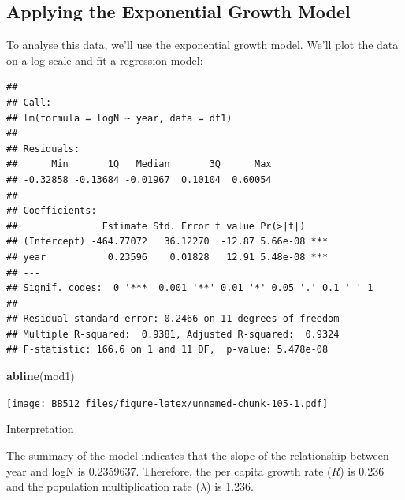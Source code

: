 \documentclass[
  a4paper]{book}
\newenvironment{Shaded}{\begin{snugshade}}{\end{snugshade}}
\newcommand{\AttributeTok}[1]{\textcolor[rgb]{0.13,0.29,0.53}{#1}}
\newcommand{\FunctionTok}[1]{\textcolor[rgb]{0.13,0.29,0.53}{\textbf{#1}}}
\newcommand{\NormalTok}[1]{#1}
\newcommand{\OtherTok}[1]{\textcolor[rgb]{0.56,0.35,0.01}{#1}}
\newcommand{\SpecialCharTok}[1]{\textcolor[rgb]{0.81,0.36,0.00}{\textbf{#1}}}
\begin{document}
\hypertarget{applying-the-exponential-growth-model}{%
\subsection{Applying the Exponential Growth Model}\label{applying-the-exponential-growth-model}}

To analyse this data, we'll use the exponential growth model. We'll plot the data on a log scale and fit a regression model:

\begin{Shaded}
\end{Shaded}

\begin{verbatim}
## 
## Call:
## lm(formula = logN ~ year, data = df1)
## 
## Residuals:
##      Min       1Q   Median       3Q      Max 
## -0.32858 -0.13684 -0.01967  0.10104  0.60054 
## 
## Coefficients:
##               Estimate Std. Error t value Pr(>|t|)    
## (Intercept) -464.77072   36.12270  -12.87 5.66e-08 ***
## year           0.23596    0.01828   12.91 5.48e-08 ***
## ---
## Signif. codes:  0 '***' 0.001 '**' 0.01 '*' 0.05 '.' 0.1 ' ' 1
## 
## Residual standard error: 0.2466 on 11 degrees of freedom
## Multiple R-squared:  0.9381, Adjusted R-squared:  0.9324 
## F-statistic: 166.6 on 1 and 11 DF,  p-value: 5.478e-08
\end{verbatim}

\begin{Shaded}
\begin{Highlighting}[]
\FunctionTok{abline}\NormalTok{(mod1)}
\end{Highlighting}
\end{Shaded}

\texttt{[image: BB512\_files/figure-latex/unnamed-chunk-105-1.pdf]}

Interpretation

The summary of the model indicates that the slope of the relationship between year and logN is 0.2359637. Therefore, the per capita growth rate (\(R\)) is 0.236 and the population multiplication rate (\(\lambda\)) is 1.236.
\end{document}
